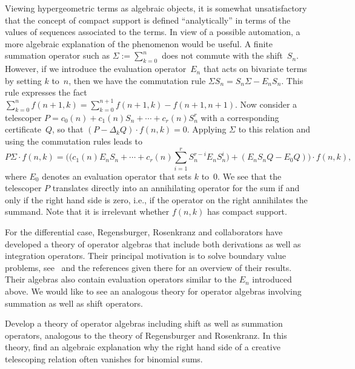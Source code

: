 \documentclass{jssc}
\begin{document}
 Viewing hypergeometric terms as algebraic objects, it is somewhat
 unsatisfactory that the concept of compact support is defined ``analytically''
 in terms of the values of sequences associated to the terms. In view of a
 possible automation, a more algebraic explanation of the phenomenon would be
 useful. A finite summation operator such as $\Sigma:=\sum_{k=0}^n$ does not
 commute with the shift~$S_n$. However, if we introduce the evaluation
 operator~$E_n$ that acts on bivariate terms by setting $k$ to~$n$, then we have
 the commutation rule $\Sigma S_n = S_n\Sigma - E_nS_n$. This rule expresses
 the fact $\sum_{k=0}^n f(n+1,k)=\sum_{k=0}^{n+1}f(n+1,k) - f(n+1,n+1)$.
 Now consider a telescoper $P=c_0(n)+c_1(n)S_n+\cdots+c_r(n)S_n^r$ with a
 corresponding certificate~$Q$, so that $(P - \Delta_k Q)\cdot f(n,k)=0$. Applying $\Sigma$ to
 this relation and using the commutation rules leads to
 \[
 P\Sigma\cdot f(n,k) =
 \biggl(\biggl(c_1(n)E_nS_n + \cdots + c_r(n)\sum_{i=1}^r S_n^{r-i}E_nS_n^i\biggr) + (E_nS_nQ - E_0Q)\biggr)\cdot f(n,k),
 \]
 where $E_0$ denotes an evaluation operator that sets $k$ to~$0$.
 We see that the telescoper $P$ translates directly into an annihilating operator for the
 sum if and only if the right hand side is zero, i.e., if the operator on the right annihilates the summand.
 Note that it is irrelevant whether $f(n,k)$ has compact support.

 For the differential case, Regensburger, Rosenkranz and collaborators have
 developed a theory of operator algebras that include both derivations as well
 as integration operators. Their principal motivation is to solve boundary value
 problems,
 see~\cite{rosenkranz08,rosenkranz08a,regensburger09,guo14,regensburger16} and
 the references given there for an overview of their results. Their algebras
 also contain evaluation operators similar to the $E_n$ introduced above. We
 would like to see an analogous theory for operator algebras involving summation
 as well as shift operators.

 \begin{problem}
   Develop a theory of operator algebras including shift as well as summation operators,
   analogous to the theory of Regensburger and Rosenkranz.
   In this theory, find an algebraic explanation why the right hand side of a creative
   telescoping relation often vanishes for binomial sums.
 \end{problem}
\end{document}
